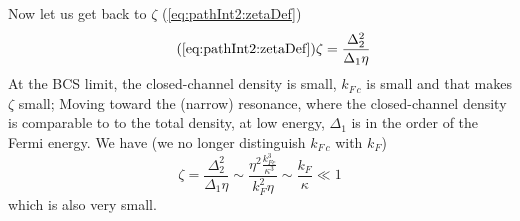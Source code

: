 \documentclass[reprint,pra]{revtex4-1}
\begin{document}
Now let us get back to $\zeta$ (\ref{eq:pathInt2:zetaDef})
\begin{equation}\tag{\ref{eq:pathInt2:zetaDef}}
\zeta=\frac{\Delta_{2}^{2}}{\Delta_{1}\eta}
\end{equation}
At the  BCS limit, the closed-channel density is small, $k_{F\,c}$ is small and that makes $\zeta$ small; Moving toward the (narrow) resonance, where the closed-channel density is comparable to to the total density, at low energy, $\Delta_{1}$ is in the order of the Fermi energy.   We have (we no longer distinguish $k_{F\,c}$ with $k_{F}$)
 \begin{equation}\label{eq:pathApp:zetaEs}
 \zeta=\frac{\Delta_{2}^{2}}{\Delta_{1}\eta}\sim\frac{\eta^{2}\frac{k_{Fc}^{3}}{\kappa^{3}}}{k_{F}^{2}\eta}\sim\frac{k_{F}}{\kappa}\ll1
\end{equation}
which is also very small. 

\end{document}
